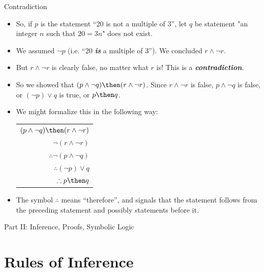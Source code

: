 \documentclass[12pt,aspectratio=1610, handout]{beamer}
\begin{document}
\begin{frame}{Contradiction}	
	\begin{itemize}
		\item So, if $p$ is the statement ``20 is not a multiple of 3'', let $q$ be statement "an integer $n$ such that $20=3n$" does not exist. \p
		
		\item We assumed $\neg p$ (i.e. ``20 \emph{\textbf{is}} a multiple of 3''). We concluded $r \wedge \neg r$. \p
		\item But $r \wedge \neg r$ is clearly false, no matter what $r$ is! This is a \emph{\textbf{contradiction}.} \p
		\item So we showed that $(p \wedge \neg q) \then (r \wedge \neg r)$. \p Since $r \wedge \neg r$ is false, $p \wedge \neg q$ is false, or $(\neg p) \vee q$ is true, or $p \then q$. \p
		\item We might formalize this in the following way: 
		\begin{center}
			\begin{tabular}{r}
				$(p \wedge \neg q) \then (r \wedge \neg r)$ \\
				$\neg(r \wedge \neg r)$ \\ 
				\hline  
				$\therefore\neg(p \wedge \neg q) $\\  
				$\therefore (\neg p) \vee q$ \\ 
				\hline  
				$\therefore p \then q$ \\
			\end{tabular}
		\end{center}
		\item The symbol $\therefore$ means ``therefore'', and signals that the statement follows from the preceding statement and possibly statements before it.  \p
	\end{itemize}
\end{frame}



\begin{frame}{}

{\Huge Part II: Inference, Proofs, Symbolic Logic}

\end{frame}



\section{Rules of Inference}
\end{document}

